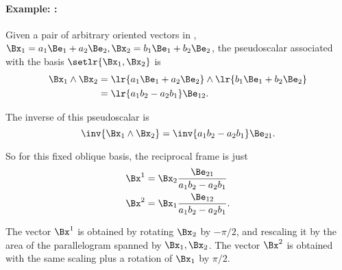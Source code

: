 \paragraph{Example: :}

Given a pair of arbitrary oriented vectors in , \( \Bx_1 = a_1 \Be_1 + a_2 \Be_2, \Bx_2 = b_1 \Be_1 + b_2 \Be_2 \), the pseudoscalar associated with the basis \( \setlr{ \Bx_1, \Bx_2} \) is
\begin{equation}\label{eqn:reciprocal_R2:260}
\begin{aligned}
\Bx_1 \wedge \Bx_2
&= \lr{ a_1 \Be_1 + a_2 \Be_2 } \wedge \lr{ b_1 \Be_1 + b_2 \Be_2 } \\
&= \lr{ a_1 b_2 - a_2 b_1 } \Be_{12}.
\end{aligned}
\end{equation}

The inverse of this pseudoscalar is
\begin{equation}\label{eqn:reciprocal_R2:280}
\inv{\Bx_1 \wedge \Bx_2 }
=
\inv{ a_1 b_2 - a_2 b_1 } \Be_{21}.
\end{equation}

So for this fixed oblique  basis, the reciprocal frame is just
\begin{equation}\label{eqn:reciprocal_R2:300}
\begin{aligned}
\Bx^1 &= \Bx_2 \frac{\Be_{21}}{ a_1 b_2 - a_2 b_1 } \\
\Bx^2 &= \Bx_1 \frac{\Be_{12}}{ a_1 b_2 - a_2 b_1 }.
\end{aligned}
\end{equation}

The vector \( \Bx^1 \) is obtained by rotating \( \Bx_2 \) by \( -\pi/2 \), and rescaling it by the area of the parallelogram spanned by \( \Bx_1, \Bx_2 \).
The vector \( \Bx^2 \) is obtained with the same scaling plus a rotation of \( \Bx_1 \) by \( \pi/2 \).

